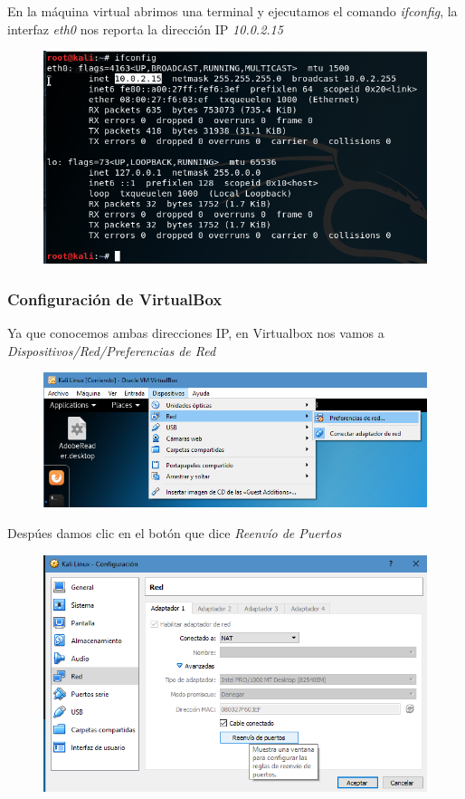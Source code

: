 \documentclass{article}
\begin{document}
En la m\'aquina virtual abrimos una terminal y ejecutamos el comando \emph{ifconfig}, la interfaz \emph{eth0} nos reporta la direcci\'on IP \emph{10.0.2.15}

\begin{figure}[H]
\centering
\includegraphics[width=1\textwidth]{02-IFCONFIG}
\end{figure}


\subsubsection{Configuraci\'on de VirtualBox}

Ya que conocemos ambas direcciones IP, en Virtualbox nos vamos a \emph{Dispositivos/Red/Preferencias de Red}

\begin{figure}[H]
\centering
\includegraphics[width=1\textwidth]{03-PREFERENCIADERED}
\end{figure}

Desp\'ues damos clic en el bot\'on que dice \emph{Reenv\'io de Puertos}

\begin{figure}[H]
\centering
\includegraphics[width=1\textwidth]{04-REENVIOPUERTOS}
\end{figure}
\end{document}
